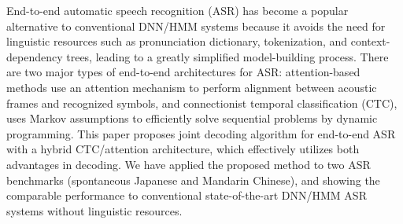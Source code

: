 End-to-end automatic speech recognition (ASR) has become a popular alternative to conventional DNN/HMM systems because it avoids the need for linguistic resources such as pronunciation dictionary, tokenization, and context-dependency trees, leading to a greatly simplified model-building process. There are two major types of end-to-end architectures for ASR: attention-based methods use an attention mechanism to perform alignment between acoustic frames and recognized symbols, and connectionist temporal classification (CTC), uses Markov assumptions to efficiently solve sequential problems by dynamic programming. This paper proposes joint decoding algorithm for end-to-end ASR with a hybrid CTC/attention architecture, which effectively utilizes both advantages in decoding. We have applied the proposed method to two ASR benchmarks (spontaneous Japanese and Mandarin Chinese), and showing the comparable performance to conventional state-of-the-art DNN/HMM ASR systems without linguistic resources.
